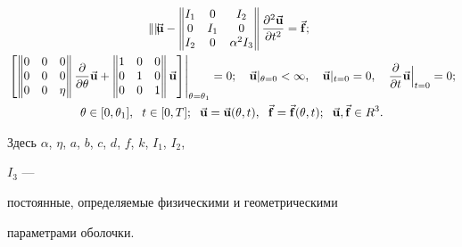 \begin{exam}
\begin{gather}
\begin{Vmatrix}
\end{Vmatrix} 


\vb{u}- 


\begin{Vmatrix} 


I_1 & 0 & I_2 \\ 0 & I_1 & 0 \\ I_2 & 0 & \alpha^2I_3 


\end{Vmatrix} 


\frac{\partial^2\vb{u}}{\partial t^2}=\vb{f};\\ 


% 


\left.\left[ 


\begin{Vmatrix} 


0 & 0 & 0 \\ 0 & 0 & 0 \\ 0 & 0 & \eta 


\end{Vmatrix} 


\frac{\partial}{\partial\theta}\vb{u}+ 


\begin{Vmatrix} 


1 & 0 & 0 \\ 0 & 1 & 0 \\ 0 & 0 & 1 


\end{Vmatrix} 


\vb{u}\right]\right|_{\theta=\theta_1}=0;\quad 


\vb{u}|_{\theta=0}<\infty,\quad 


\vb{u}|_{t=0}=0,\quad 


\frac{\partial}{\partial t}\vb{u}\Big |_{t=0}=0;\notag \\ 


\theta\in[0,\theta_1],\ \; t\in[0,T]; 


\ \; \vb{u}=\vb{u}(\theta,t),\ \; \vb{f}=\vb{f}(\theta,t); 


\ \; \vb{u},\vb{f}\in R^3.\notag 


\end{gather} 


Здесь $\alpha$, $\eta$, $a$, $b$, $c$, $d$, $f$, $k$, $I_1$, $I_2$, 


$I_3$ --- 


постоянные, определяемые физическими и геометрическими 


параметрами оболочки. 



\end{exam}
